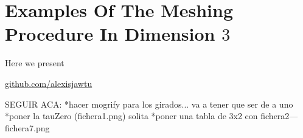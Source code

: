 \section{Examples Of The Meshing Procedure In Dimension $3$} %
\label{sec:examples_of_the_meshing_procedure}

Here we present


\href{https://github.com/alexisjawtu/mesher}{github.com/alexisjawtu}


SEGUIR ACA: 
*hacer mogrify para los girados... va a tener que ser de a uno
*poner la tauZero (fichera1.png) solita
*poner una tabla de 3x2 con fichera2---fichera7.png


